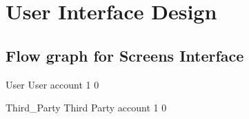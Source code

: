 \documentclass[../DD0.tex]{subfiles}
\begin{document}
\section {User Interface Design}
\label{sec:ui}
\subsection{Flow graph for Screens Interface}

\label{sec:userdes}

    \fetchUML
      {User}
      {User account}
      {1}           %
      {0}           %

  \clearpage

\label{sec:thirdpartydes}

    \fetchUML
      {Third_Party}
      {Third Party account}
      {1}           %
      {0}           %


\end{document}
